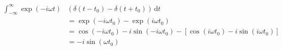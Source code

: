\documentclass[10pt]{article}
\begin{document}
\begin{align*}\int_{-\infty}^{\infty}\exp(-i\omega t)&(\delta(t-t_0)-\delta(t+t_0))\,\mathrm{d}t \\
&= \exp(-i\omega t_0)-\exp(i\omega t_0) \\
&= \cos(-i\omega t_0)-i\sin(-i\omega t_0)-[\cos(i\omega t_0)-i\sin(i\omega t_0)] \\
&= -i\sin(\omega t_0)\end{align*}
\end{document}
